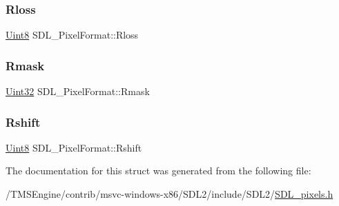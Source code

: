 \subsubsection{\texorpdfstring{Rloss}{Rloss}}
{\footnotesize\ttfamily \hyperlink{_s_d_l__stdinc_8h_a2944638813a090aa23e62f4da842c3e2}{Uint8} S\+D\+L\+\_\+\+Pixel\+Format\+::\+Rloss}

\mbox{\label{struct_s_d_l___pixel_format_a35e5793f6e9c356aec2d130167174946}} 
\subsubsection{\texorpdfstring{Rmask}{Rmask}}
{\footnotesize\ttfamily \hyperlink{_s_d_l__stdinc_8h_add440eff171ea5f55cb00c4a9ab8672d}{Uint32} S\+D\+L\+\_\+\+Pixel\+Format\+::\+Rmask}

\mbox{\label{struct_s_d_l___pixel_format_abfdec7b9ee2ee39db630f4022e4e0daa}} 
\subsubsection{\texorpdfstring{Rshift}{Rshift}}
{\footnotesize\ttfamily \hyperlink{_s_d_l__stdinc_8h_a2944638813a090aa23e62f4da842c3e2}{Uint8} S\+D\+L\+\_\+\+Pixel\+Format\+::\+Rshift}



The documentation for this struct was generated from the following file\+:\begin{DoxyCompactItemize}
\item 
/\+T\+M\+S\+Engine/contrib/msvc-\/windows-\/x86/\+S\+D\+L2/include/\+S\+D\+L2/\hyperlink{_s_d_l__pixels_8h}{S\+D\+L\+\_\+pixels.\+h}\end{DoxyCompactItemize}
